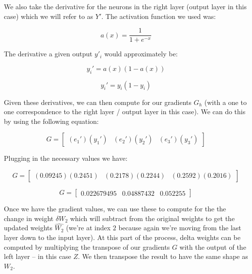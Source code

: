 \documentclass[a4paper]{article}
\begin{document}
We also take the derivative for the neurons in the right layer (output layer in this case) which we will refer to as $Y'$. The activation function we used was:

\begin{equation}
  a(x) = \frac{1}{1 + e^{-x}}
\end{equation}

The derivative a given output $y'_{i}$ would approximately be:

\begin{equation}
  y_i'=a(x)(1-a(x))
\end{equation}

\begin{equation}
  y_i'=y_{i}(1-y_{i})
\end{equation}

Given these derivatives, we can then compute for our gradients $G_{h}$ (with a one to one correspondence to the right layer / output layer in this case). We can do this by using the following equation:

\begin{equation}
  G=\begin{bmatrix}
          (e_{1}')(y_{1}') & (e_{2}')(y_{2}') & (e_{3}')(y_{3}')
        \end{bmatrix}
\end{equation}

Plugging in the necessary values we have:

\begin{equation}
  G=\begin{bmatrix}
          (0.09245)(0.2451) & (0.2178)(0.2244) & (0.2592)(0.2016)
        \end{bmatrix}
\end{equation}

\begin{equation}
  G=\begin{bmatrix}
          0.022679495 & 0.04887432 & 0.052255
        \end{bmatrix}
\end{equation}

Once we have the gradient values, we can use these to compute for the the change in weight $\delta{W_{2}}$ which will subtract from the original weights to get the updated weights $\widehat{W_{2}}$ (we're at index $2$ because again we're moving from the last layer down to the input layer). At this part of the process, delta weights can be computed by multiplying the transpose of our gradients $G$ with the output of the left layer -- in this case $Z$. We then transpose the result to have the same shape as $W_{2}$.
\end{document}
